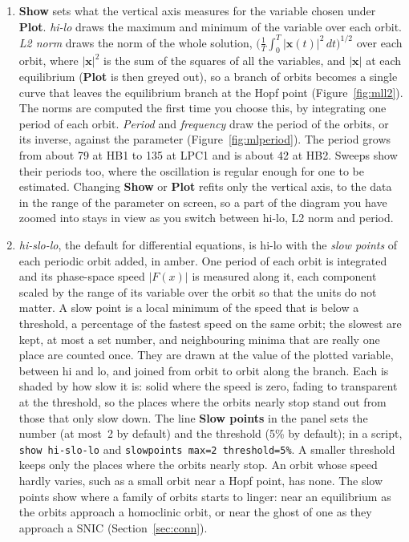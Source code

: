 \documentclass[11pt,a4paper]{article}
\newcommand{\ui}[1]{\textsf{\textbf{#1}}}          %
\begin{document}
\begin{tryit}
\begin{enumerate}
  \item \ui{Show} sets what the vertical axis measures for the variable chosen under \ui{Plot}. \emph{hi-lo} draws the maximum and minimum of the variable over each orbit. \emph{L2 norm} draws the norm of the whole solution, $\bigl(\frac1T\int_0^T |\mathbf{x}(t)|^2\,dt\bigr)^{1/2}$ over each orbit, where $|\mathbf{x}|^2$ is the sum of the squares of all the variables, and $|\mathbf{x}|$ at each equilibrium (\ui{Plot} is then greyed out), so a branch of orbits becomes a single curve that leaves the equilibrium branch at the Hopf point (Figure~\ref{fig:mll2}). The norms are computed the first time you choose this, by integrating one period of each orbit. \emph{Period} and \emph{frequency} draw the period of the orbits, or its inverse, against the parameter (Figure~\ref{fig:mlperiod}). The period grows from about 79 at HB1 to 135 at LPC1 and is about 42 at HB2. Sweeps show their periods too, where the oscillation is regular enough for one to be estimated. Changing \ui{Show} or \ui{Plot} refits only the vertical axis, to the data in the range of the parameter on screen, so a part of the diagram you have zoomed into stays in view as you switch between hi-lo, L2 norm and period.
  \item \emph{hi-slo-lo}, the default for differential equations, is hi-lo with the \emph{slow points} of each periodic orbit added, in amber. One period of each orbit is integrated and its phase-space speed $|F(x)|$ is measured along it, each component scaled by the range of its variable over the orbit so that the units do not matter. A slow point is a local minimum of the speed that is below a threshold, a percentage of the fastest speed on the same orbit; the slowest are kept, at most a set number, and neighbouring minima that are really one place are counted once. They are drawn at the value of the plotted variable, between hi and lo, and joined from orbit to orbit along the branch. Each is shaded by how slow it is: solid where the speed is zero, fading to transparent at the threshold, so the places where the orbits nearly stop stand out from those that only slow down. The line \ui{Slow points} in the panel sets the number (at most~2 by default) and the threshold (5\% by default); in a script, \texttt{show hi-slo-lo} and \texttt{slowpoints max=2 threshold=5\%}. A smaller threshold keeps only the places where the orbits nearly stop. An orbit whose speed hardly varies, such as a small orbit near a Hopf point, has none. The slow points show where a family of orbits starts to linger: near an equilibrium as the orbits approach a homoclinic orbit, or near the ghost of one as they approach a SNIC (Section~\ref{sec:conn}).

\end{enumerate}
\end{tryit}
\end{document}
